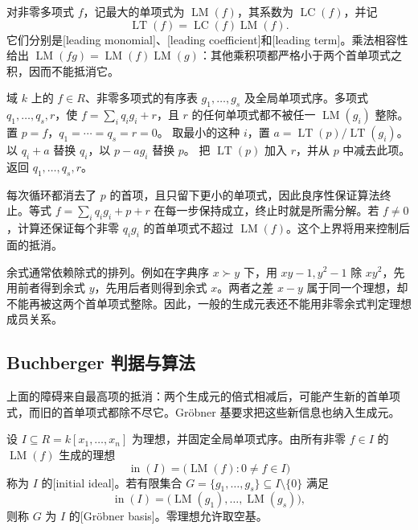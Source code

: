 对非零多项式 \(f\)，记最大的单项式为 \(\operatorname{LM}(f)\)，其系数为 \(\operatorname{LC}(f)\)，并记
\[
	\operatorname{LT}(f)=\operatorname{LC}(f)\operatorname{LM}(f).
\]
它们分别是[leading monomial]、[leading coefficient]和[leading term]。乘法相容性给出 \(\operatorname{LM}(fg)=\operatorname{LM}(f)\operatorname{LM}(g)\)：其他乘积项都严格小于两个首单项式之积，因而不能抵消它。

\begin{algorithm}[htbp]
	\caption{多元除法}\label{g5:alg:polynomial-division}
	\begin{algorithmsteps}{域 \(k\) 上的 \(f\in R\)、非零多项式的有序表 \(g_1,\ldots,g_s\) 及全局单项式序。}{多项式 \(q_1,\ldots,q_s,r\)，使 \(f=\sum_iq_ig_i+r\)，且 \(r\) 的任何单项式都不被任一 \(\operatorname{LM}(g_i)\) 整除。}
		\State 置 \(p=f\)，\(q_1=\cdots=q_s=r=0\)。
				\State 取最小的这种 \(i\)，置 \(a=\operatorname{LT}(p)/\operatorname{LT}(g_i)\)。
				\State 以 \(q_i+a\) 替换 \(q_i\)，以 \(p-ag_i\) 替换 \(p\)。
			\Else
				\State 把 \(\operatorname{LT}(p)\) 加入 \(r\)，并从 \(p\) 中减去此项。
			\EndIf
		\EndWhile
		\State 返回 \(q_1,\ldots,q_s,r\)。
	\end{algorithmsteps}
\end{algorithm}

每次循环都消去了 \(p\) 的首项，且只留下更小的单项式，因此良序性保证算法终止。等式 \(f=\sum_iq_ig_i+p+r\) 在每一步保持成立，终止时就是所需分解。若 \(f\ne0\)，计算还保证每个非零 \(q_ig_i\) 的首单项式不超过 \(\operatorname{LM}(f)\)。这个上界将用来控制后面的抵消。

余式通常依赖除式的排列。例如在字典序 \(x\succ y\) 下，用 \(xy-1,y^2-1\) 除 \(xy^2\)，先用前者得到余式 \(y\)，先用后者则得到余式 \(x\)。两者之差 \(x-y\) 属于同一个理想，却不能再被这两个首单项式整除。因此，一般的生成元表还不能用非零余式判定理想成员关系。

\subsection{Buchberger 判据与算法}
\label{g5:subsec:0104:02}
上面的障碍来自最高项的抵消：两个生成元的倍式相减后，可能产生新的首单项式，而旧的首单项式都除不尽它。Gröbner 基要求把这些新信息也纳入生成元。

\begin{definition}\label{g5:def:groebner-basis}
	设 \(I\subseteq R=k[x_1,\ldots,x_n]\) 为理想，并固定全局单项式序。由所有非零 \(f\in I\) 的 \(\operatorname{LM}(f)\) 生成的理想
	\[
		\operatorname{in}(I)=\bigl(\operatorname{LM}(f):0\ne f\in I\bigr)
	\]
	称为 \(I\) 的[initial ideal]。若有限集合 \(G=\{g_1,\ldots,g_s\}\subseteq I\setminus\{0\}\) 满足
	\[
		\operatorname{in}(I)=\bigl(\operatorname{LM}(g_1),\ldots,\operatorname{LM}(g_s)\bigr),
	\]
	则称 \(G\) 为 \(I\) 的[Gröbner basis]。零理想允许取空基。
\end{definition}

